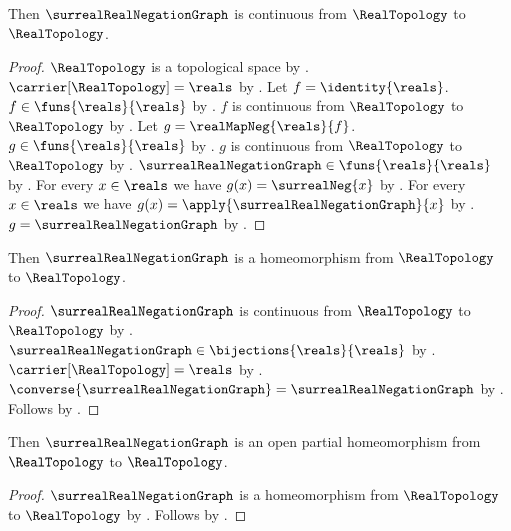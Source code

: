 \begin{theorem}\label{real_reflection_continuous}
    Then $\surrealRealNegationGraph$ is continuous from $\RealTopology$ to $\RealTopology$.
\end{theorem}
\begin{proof}
    $\RealTopology$ is a topological space by .
    $\carrier[\RealTopology]=\reals$ by .
    Let $f=\identity{\reals}$.
    $f\in\funs{\reals}{\reals}$ by .
    $f$ is continuous from $\RealTopology$ to $\RealTopology$ by
        .
    Let $g=\realMapNeg{\reals}{f}$.
    $g\in\funs{\reals}{\reals}$ by .
    $g$ is continuous from $\RealTopology$ to $\RealTopology$ by
        .
    $\surrealRealNegationGraph\in\funs{\reals}{\reals}$ by
        .
    For every $x\in\reals$ we have $g(x)=\surrealNeg{x}$ by
        .
    For every $x\in\reals$ we have $g(x)=\apply{\surrealRealNegationGraph}{x}$ by
        .
    $g=\surrealRealNegationGraph$ by .
\end{proof}

\begin{classification}\label{real_reflection_homeomorphism}
    Then $\surrealRealNegationGraph$ is a homeomorphism from $\RealTopology$ to $\RealTopology$.
\end{classification}
\begin{proof}
    $\surrealRealNegationGraph$ is continuous from $\RealTopology$ to $\RealTopology$ by
        .
    $\surrealRealNegationGraph\in\bijections{\reals}{\reals}$ by
        .
    $\carrier[\RealTopology]=\reals$ by .
    $\converse{\surrealRealNegationGraph}=\surrealRealNegationGraph$ by
        .
    Follows by .
\end{proof}

\begin{theorem}\label{real_reflection_partial_homeomorphism}
    Then $\surrealRealNegationGraph$ is an open partial homeomorphism
        from $\RealTopology$ to $\RealTopology$.
\end{theorem}
\begin{proof}
    $\surrealRealNegationGraph$ is a homeomorphism from $\RealTopology$ to $\RealTopology$
        by .
    Follows by .
\end{proof}
